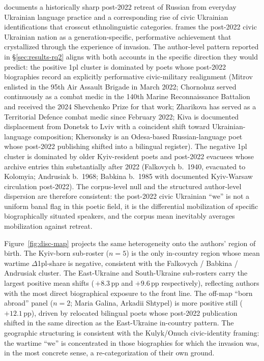 \documentclass[12pt]{interact}
\theoremstyle{plain}%
\theoremstyle{definition}
\theoremstyle{remark}
\begin{document}
\citet{kulyk2022imperfect, kulyk2024language} documents a historically sharp post-2022 retreat of Russian from everyday Ukrainian language practice and a corresponding rise of civic Ukrainian identifications that crosscut ethnolinguistic categories. \citet{onuch2022the} frames the post-2022 civic Ukrainian nation as a generation-specific, performative achievement that crystallized through the experience of invasion. The author-level pattern reported in \S\ref{sec:results-rq2} aligns with both accounts in the specific direction they would predict: the positive 1pl cluster is dominated by poets whose post-2022 biographies record an explicitly performative civic-military realignment (Mitrov enlisted in the 95th Air Assault Brigade in March 2022; Chornohuz served continuously as a combat medic in the 140th Marine Reconnaissance Battalion and received the 2024 Shevchenko Prize for that work; Zharikova has served as a Territorial Defence combat medic since February 2022; Kiva is documented displacement from Donetsk to Lviv with a coincident shift toward Ukrainian-language composition; Khersonsky is an Odesa-based Russian-language poet whose post-2022 publishing shifted into a bilingual register). The negative 1pl cluster is dominated by older Kyiv-resident poets and post-2022 evacuees whose archive entries thin substantially after 2022 (Falkovych b.~1940, evacuated to Kolomyia; Andrusiak b.~1968; Babkina b.~1985 with documented Kyiv-Warsaw circulation post-2022). The corpus-level null and the structured author-level dispersion are therefore consistent: the post-2022 civic Ukrainian ``we'' is not a uniform banal flag in this poetic field, it is the differential mobilization of specific biographically situated speakers, and the corpus mean inevitably averages mobilization against retreat.

Figure~\ref{fig:disc-map} projects the same heterogeneity onto the authors' region of birth. The Kyiv-born sub-roster ($n = 5$) is the only in-country region whose mean wartime $\Delta$1pl-share is negative, consistent with the Falkovych / Babkina / Andrusiak cluster. The East-Ukraine and South-Ukraine sub-rosters carry the largest positive mean shifts (\,$+8.3\,$pp and $+9.6\,$pp respectively), reflecting authors with the most direct biographical exposure to the front line. The off-map ``born abroad'' panel ($n = 2$; Maria Galina, Arkadii Shtypel) is more positive still ($+12.1\,$pp), driven by relocated bilingual poets whose post-2022 publication shifted in the same direction as the East-Ukraine in-country pattern. The geographic structuring is consistent with the Kulyk/Onuch civic-identity framing: the wartime ``we'' is concentrated in those biographies for which the invasion was, in the most concrete sense, a re-categorization of their own ground.
\end{document}
